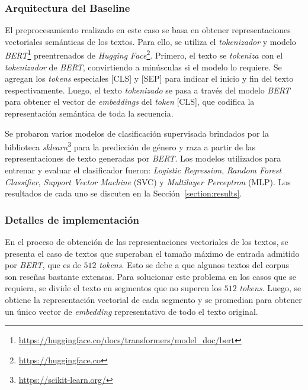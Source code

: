 \subsubsection{Arquitectura del Baseline}
El preprocesamiento realizado en este caso se basa en obtener representaciones vectoriales sem\'anticas 
de los textos. Para ello, se utiliza el \emph{tokenizador} y modelo 
\emph{BERT}\footnote{\url{https://huggingface.co/docs/transformers/model_doc/bert}} preentrenados de 
\emph{Hugging Face}\footnote{\url{https://huggingface.co}}. Primero, el texto se \emph{tokeniza} con el 
\emph{tokenizador} de \emph{BERT}, convirtiendo a min\'usculas si el modelo lo requiere. Se agregan los 
\emph{tokens} especiales [CLS] y [SEP] para indicar el inicio y fin del texto respectivamente.
Luego, el texto \emph{tokenizado} se pasa a trav\'es del modelo \emph{BERT} para obtener el vector de 
\emph{embeddings} del \emph{token} [CLS], que codifica la representaci\'on sem\'antica de toda la secuencia. 

Se probaron varios modelos de clasificaci\'on supervisada brindados por la biblioteca 
\emph{sklearn}\footnote{\url{https://scikit-learn.org/}} para la predicci\'on de g\'enero y raza 
a partir de las representaciones de texto generadas por \emph{BERT}. Los modelos utilizados para 
entrenar y evaluar el clasificador fueron: \emph{Logistic Regression}, 
\emph{Random Forest Classifier}, \emph{Support Vector Machine} (SVC) y \emph{Multilayer Perceptron} (MLP).
Los resultados de cada uno se discuten en la Secci\'on~\ref{section:results}.

\subsubsection{Detalles de implementaci\'on}

En el proceso de obtenci\'on de las representaciones vectoriales de los textos, se presenta el caso
de textos que superaban el tama\~no m\'aximo de entrada admitido por \emph{BERT}, que es de $512$ \emph{tokens}.
Esto se debe a que algunos textos del corpus son rese\~nas bastante extensas. Para solucionar este problema en 
los casos que se requiera, se divide el texto en segmentos que no superen los $512$ \emph{tokens}. Luego, se obtiene
la representaci\'on vectorial de cada segmento y se promedian para obtener un \'unico vector de \emph{embedding}
representativo de todo el texto original.

